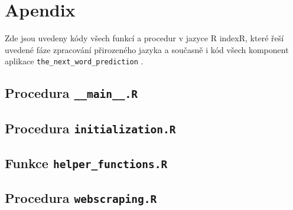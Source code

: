 
\section{Apendix}
\label{sec:Apendix}

Zde jsou uvedeny kódy všech funkcí a procedur v jazyce \textsf{R}%
index{\textsf{R}}, které
řeší uvedené fáze zpracování přirozeného jazyka%
 a současně i kód
všech komponent aplikace \texttt{the\_next\_word\_prediction}%
.


\subsection{Procedura \texttt{\_\_main\_\_.R}}




\subsection{Procedura \texttt{initialization.R}}




\subsection{Funkce \texttt{helper\_functions.R}}




\subsection{Procedura \texttt{webscraping.R}}




